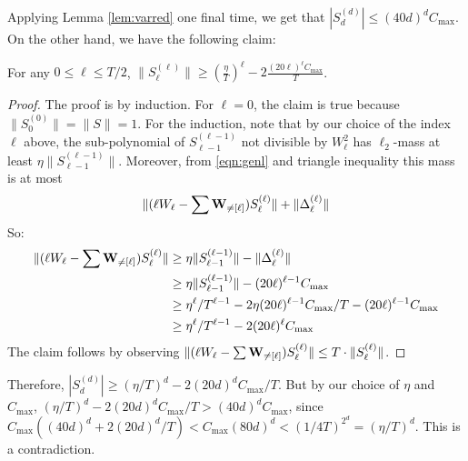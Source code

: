 Applying Lemma \ref{lem:varred} one final time, we get that $|S_d^{(d)}| \leq (40d)^{d} C_{\max}$. On the other hand, we have the following claim:
\begin{claim}
For any $0\leq \ell \leq T/2$, $\|S^{(\ell)}_\ell\| \geq \left(\frac{\eta}{T}\right)^\ell - 2\frac{(20\ell)^\ell C_{\max}}{T}$. 
\end{claim}
\begin{proof}
The proof is by induction. For $\ell=0$, the claim is true because $\|S_0^{(0)}\| = \|S\| = 1$. For the induction, note that by our choice of the index $\ell$ above, the sub-polynomial of  $S^{(\ell-1)}_{\ell-1}$ not divisible by $W_\ell^2$ has $\ell_2$-mass at least $\eta \|S^{(\ell-1)}_{\ell-1}\|$. Moreover, from \eqref{eqn:genl}  and triangle inequality this mass is at most
\[
\|(\ell W_\ell - \sum \mathbf{W}_{\neq [\ell]})S_\ell^{(\ell)}\| + \|\Delta_\ell^{(\ell)}\|
\] 
So: 
\begin{align*}
\|(\ell W_\ell - \sum \mathbf{W}_{\neq [\ell]})S_\ell^{(\ell)}\| &\geq \eta \|S^{(\ell-1)}_{\ell-1}\| - \|\Delta_\ell^{(\ell)}\| \\
&\geq \eta \|S^{(\ell-1)}_{\ell-1}\| - (20\ell)^{\ell-1} C_{\max} \\
&\geq \eta^\ell/T^{\ell-1} - 2\eta(20 \ell)^{\ell-1}C_{\max}/T  -(20\ell)^{\ell-1}C_{\max}\\ 
&\geq \eta^\ell/T^{\ell-1}- 2 (20\ell)^{\ell}C_{\max}
\end{align*}
The claim follows by observing $\|(\ell W_\ell - \sum \mathbf{W}_{\neq [\ell]})S_\ell^{(\ell)}\| \leq T\cdot \|S^{(\ell)}_\ell\|$. 
\end{proof}

Therefore, $|S^{(d)}_d| \geq (\eta/T)^d - 2(20d)^d C_{\max}/T$. But by our choice of $\eta$ and $C_{\max}$,  $(\eta/T)^d - 2(20d)^d C_{\max}/T > (40d)^d C_{\max}$, since $C_{\max}((40d)^d + 2(20d)^d/T) < C_{\max} (80d)^d <  (1/4T)^{2^d} = (\eta/T)^d$. This is a contradiction.
